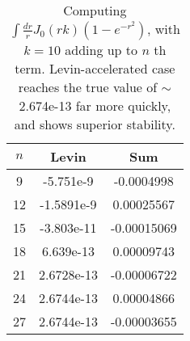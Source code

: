 \documentclass[a4,12pt]{article}
\begin{document}
\begin{table}
	\begin{center}
	\begin{tabular}{|c||c|c|}
		\hline
		$n$&Levin&Sum\\\hline
		9&	-5.751e-9&	-0.0004998\\\hline
		12&	-1.5891e-9&	0.00025567\\\hline
		15&	-3.803e-11&	-0.00015069\\\hline
		18&	6.639e-13&	0.00009743\\\hline
		21&	2.6728e-13&	-0.00006722\\\hline
		24&	2.6744e-13&	0.00004866\\\hline
		27&	2.6744e-13&	-0.00003655\\\hline
	\end{tabular}
	\end{center}
	\caption{
		Computing $\int \frac{dr}{r}J_0(r k)(1-e^{-r^2})$, with $k=10$ adding up to $n$ th term.
		Levin-accelerated case reaches the true value of $\sim$2.674e-13 far more quickly, and shows superior stability.
	}
\label{tab:levin}
\end{table}
\printbibliography
\end{document}
